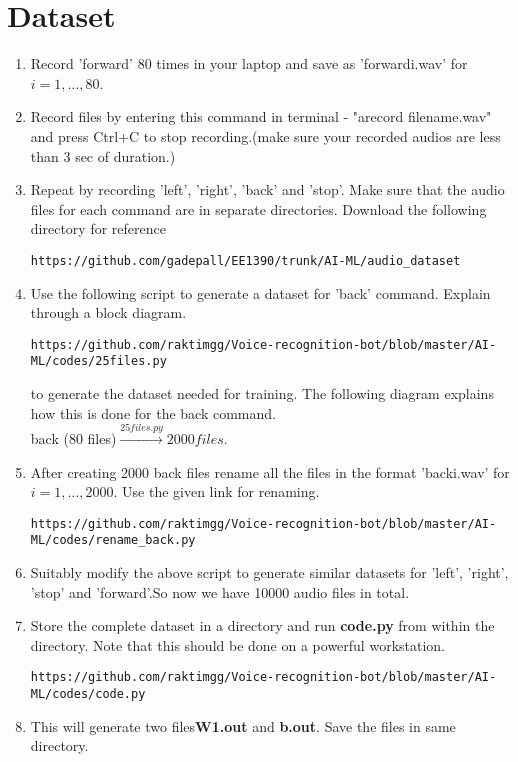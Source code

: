 \documentclass[journal,12pt,twocolumn]{IEEEtran}
\renewcommand\thesection{\arabic{section}}
\begin{document}
\section{Dataset}
%
\begin{enumerate}[label=\thesection.\arabic*
,ref=\thesection.\theenumi]


\item Record 'forward' 80 times in your laptop and save as 'forwardi.wav' for $i 
= 1,\dots, 80$.
%
\item Record files by entering this command in terminal - "arecord filename.wav" and press Ctrl+C to stop recording.(make sure your recorded audios are  less than 3 sec of duration.)
\item Repeat by recording 'left', 'right', 'back' and 'stop'. Make sure that the 
audio files for each command are in separate directories. Download the following 
directory for reference
\begin{lstlisting}
https://github.com/gadepall/EE1390/trunk/AI-ML/audio_dataset
\end{lstlisting}
\item Use the following script to generate a dataset for 'back' command. Explain 
through a block diagram.
\begin{lstlisting}
https://github.com/raktimgg/Voice-recognition-bot/blob/master/AI-ML/codes/25files.py
\end{lstlisting}
%
\solution
to generate the dataset needed for training. The following diagram explains how this 
is done for the back command.
\\
back (80 files)$\overset{25files.py}{\rightarrow}2000 files$.
\item After creating 2000 back files rename all the files in the format 'backi.wav' for $i 
= 1,\dots, 2000$. 
Use the given link for renaming.
\begin{lstlisting}
https://github.com/raktimgg/Voice-recognition-bot/blob/master/AI-ML/codes/rename_back.py
\end{lstlisting}
%
\item Suitably modify the above script to generate similar datasets for 'left', 'right', 'stop' and 'forward'.So now we have 10000 audio files in total.
%

\item Store the complete dataset in a directory and run \textbf{code.py} from  within the 
directory.  Note that this should be done on a powerful workstation.
\begin{lstlisting}
https://github.com/raktimgg/Voice-recognition-bot/blob/master/AI-ML/codes/code.py
\end{lstlisting}
\item This will generate two files\textbf{W1.out} and \textbf{b.out}. Save the files in same directory.
\end{enumerate}
%
\end{document}
